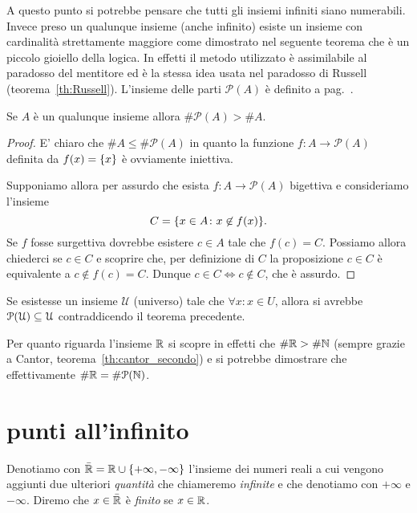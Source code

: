 A questo punto si potrebbe pensare che
tutti gli insiemi infiniti siano numerabili.
Invece preso un qualunque insieme (anche infinito)
esiste un insieme con cardinalità strettamente maggiore
come dimostrato nel seguente teorema che è un piccolo gioiello della logica.
In effetti il metodo utilizzato è assimilabile al paradosso del mentitore 
ed è la stessa idea usata nel paradosso di Russell (teorema~\ref{th:Russell}).
L'insieme delle parti $\mathcal P(A)$ è definito a pag.~\pageref{def:insieme_parti}.
%
\begin{theorem}[Cantor]%
\label{th:Cantor}%
  Se $A$ è un qualunque insieme allora $\# \mathcal P(A) > \# A$.
\end{theorem}
%
\begin{proof}
  E' chiaro che $\# A \le \#\mathcal P(A)$ in quanto 
  la funzione $f\colon A \to \mathcal P(A)$ definita da $f(x)=\ENCLOSE{x}$
  è ovviamente iniettiva.

  Supponiamo allora per assurdo che esista $f\colon A\to \mathcal P(A)$
  bigettiva e consideriamo l'insieme 
  \[
    C = \ENCLOSE{x\in A \colon x\not\in f(x)}.  
  \]
  Se $f$ fosse surgettiva dovrebbe esistere $c\in A$ tale che $f(c) = C$.
  Possiamo allora chiederci se $c\in C$ e scoprire che, 
  per definizione di $C$ la proposizione $c\in C$ è equivalente 
  a $c\not\in f(c) = C$. 
  Dunque $c\in C \iff c\not\in C$, che è assurdo.
\end{proof}
%
\begin{corollary}
  Se esistesse un insieme $\mathcal U$ (universo) 
  tale che $\forall x\colon x \in U$, allora 
  si avrebbe $\mathcal \P(\mathcal U) \subset \mathcal U$
  contraddicendo il teorema precedente.
\end{corollary}
%
Per quanto riguarda l'insieme $\RR$ si
scopre in effetti che $\#\RR > \#\NN$
(sempre grazie a Cantor, teorema~\ref{th:cantor_secondo})
e si potrebbe dimostrare che effettivamente $\#\RR = \#\mathcal P(\NN)$.

\section{punti all'infinito}
\label{sec:reali_estesi}

\begin{definition}
\mymargin{$\bar{\RR}$}
Denotiamo con $\bar \RR=\RR \cup \ENCLOSE{+\infty, -\infty}$ l'insieme dei numeri reali
\mymargin{$+\infty$, $-\infty$}
a cui vengono aggiunti due ulteriori \emph{quantità} che chiameremo
\emph{infinite} e che denotiamo con $+\infty$ e $-\infty$.
Diremo che $x\in \bar \RR$ è \emph{finito} se $x\in \RR$.
\end{definition}



